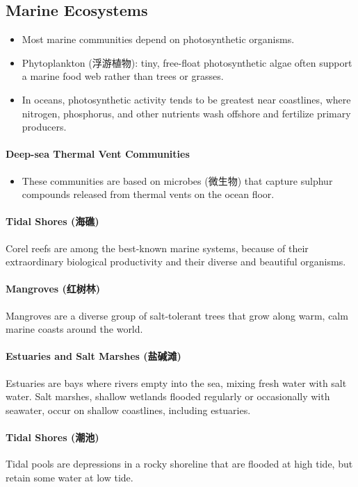 \documentclass[10pt]{article}
\begin{document}
\subsection{Marine Ecosystems}
\begin{itemize}
    \item Most marine communities depend on photosynthetic organisms. 
    \item Phytoplankton (浮游植物): tiny, free-float photosynthetic algae often support a marine food web rather than trees or grasses. 
    \item In oceans, photosynthetic activity tends to be greatest near coastlines, where nitrogen, phosphorus, and other nutrients wash offshore and fertilize primary producers. 
\end{itemize}


\paragraph{Deep-sea Thermal Vent Communities}
\begin{itemize}
    \item These communities are based on microbes (微生物) that capture sulphur compounds released from thermal vents on the ocean floor. 
\end{itemize}

\paragraph{Tidal Shores (海礁)} Corel reefs are among the best-known marine systems, because of their extraordinary biological productivity and their diverse and beautiful organisms. 

\paragraph{Mangroves (红树林)} Mangroves are a diverse group of salt-tolerant trees that grow along warm, calm marine coasts around the world. 

\paragraph{Estuaries and Salt Marshes (盐碱滩)} Estuaries are bays where rivers empty into the sea, mixing fresh water with salt water. Salt marshes, shallow wetlands flooded regularly or occasionally with seawater, occur on shallow coastlines, including estuaries. 

\paragraph{Tidal Shores (潮池)} Tidal pools are depressions in a rocky shoreline that are flooded at high tide, but retain some water at low tide. 
\end{document}
